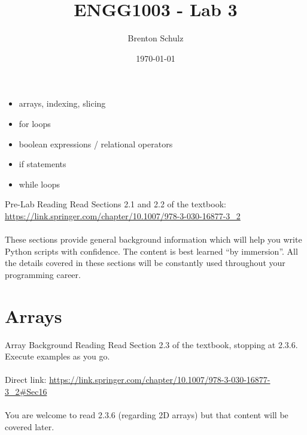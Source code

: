 \documentclass{lab}
\title{ENGG1003 - Lab 3}
\author{Brenton Schulz}
\date{\today}
\begin{document}
\maketitle

\begin{itemize}
\item arrays, indexing, slicing
\item for loops
\item boolean expressions / relational operators
\item if statements
\item while loops
\end{itemize}

\begin{task}{Pre-Lab Reading}{}
Read Sections 2.1 and 2.2 of the textbook: \url{https://link.springer.com/chapter/10.1007/978-3-030-16877-3_2}
\\~\\
These sections provide general background information which will help you write Python scripts with confidence. The content is best learned ``by immersion''. All the details covered in these sections will be constantly used throughout your programming career.
\end{task}

\section{Arrays}

\begin{task}{Array Background Reading}{}
Read Section 2.3 of the textbook, stopping at 2.3.6. Execute examples as you go.
\\~\\
Direct link: \url{https://link.springer.com/chapter/10.1007/978-3-030-16877-3_2#Sec16}
\\~\\
You are welcome to read 2.3.6 (regarding 2D arrays) but that content will be covered later.
\end{task}
\end{document}

